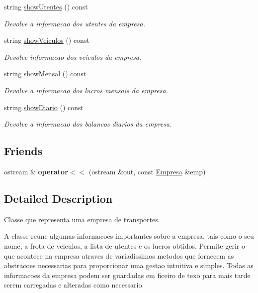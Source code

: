 \begin{DoxyCompactItemize}
$$string \mbox{\hyperlink{class_empresa_acd94b5de5f758663768d4c4af41b0039}{show\+Utentes}} () const
\begin{DoxyCompactList}\small\item\em Devolve a informacao dos utentes da empresa. \end{DoxyCompactList}\item 
string \mbox{\hyperlink{class_empresa_a5a6d0c8a801a77a5bf48e32a96890c61}{show\+Veiculos}} () const
\begin{DoxyCompactList}\small\item\em Devolve informacao dos veiculos da empresa. \end{DoxyCompactList}\item 
string \mbox{\hyperlink{class_empresa_a3dbd5fca995d27f9911d5e694e01c76e}{show\+Mensal}} () const
\begin{DoxyCompactList}\small\item\em Devolve a informacao dos lucros mensais da empresa. \end{DoxyCompactList}\item 
string \mbox{\hyperlink{class_empresa_a3c7180cf55b876478c0774055f2cfd31}{show\+Diario}} () const
\begin{DoxyCompactList}\small\item\em Devolve a informacao dos balancos diarios da empresa. \end{DoxyCompactList}\end{DoxyCompactItemize}
\subsection*{Friends}
\begin{DoxyCompactItemize}
\item 
\mbox{\label{class_empresa_a112287fd62f96ae691f61dae056dcd79}} 
ostream \& {\bfseries operator$<$$<$} (ostream \&out, const \mbox{\hyperlink{class_empresa}{Empresa}} \&emp)
\end{DoxyCompactItemize}


\subsection{Detailed Description}
Classe que representa uma empresa de transportes. 

A classe reune algumas informacoes importantes sobre a empresa, tais como o seu nome, a frota de veiculos, a lista de utentes e os lucros obtidos. Permite gerir o que acontece na empresa atraves de variadissimos metodos que fornecem as abstracoes necessarias para proporcionar uma gestao intuitiva e simples. Todas as informacoes da empresa podem ser guardadas em ficeiro de texo para mais tarde serem carregadas e alteradas como necessario. 

